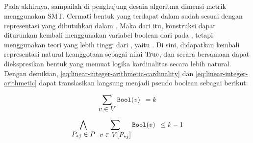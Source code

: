 \subsection{}

Pada akhirnya, sampailah di penghujung desain algoritma dimensi metrik menggunakan SMT. Cermati bentuk  yang terdapat dalam  sudah sesuai dengan representasi  yang dibutuhkan dalam . Maka dari itu, konstruksi  dapat diturunkan kembali menggunakan variabel boolean dari pada , tetapi menggunakan teori yang lebih tinggi dari , yaitu . Di sini, didapatkan kembali representasi natural keanggotaan sebagai nilai \(\mathrm{True}\), dan secara bersamaan dapat diekspresikan bentuk  yang memuat logika kardinalitas secara lebih natural. Dengan demikian, \autoref{eq:linear-integer-arithmetic-cardinality} dan \autoref{eq:linear-integer-arithmetic} dapat translasikan langsung menjadi pseudo boolean sebagai berikut:

\begin{equation}
	\sum \limits_{\displaystyle v \in V} \mathtt{Bool}(v) \enspace = k
	\label{eq:pseudo-boolean-cardinality}
\end{equation}

\begin{equation}
	\bigwedge \limits_{\displaystyle P_{*j} \in P} \enspace \sum \limits_{\displaystyle v \in V[P_{*j}]} \mathtt{Bool}(v) \enspace \leq k - 1
	\label{eq:pseudo-boolean}
\end{equation}

